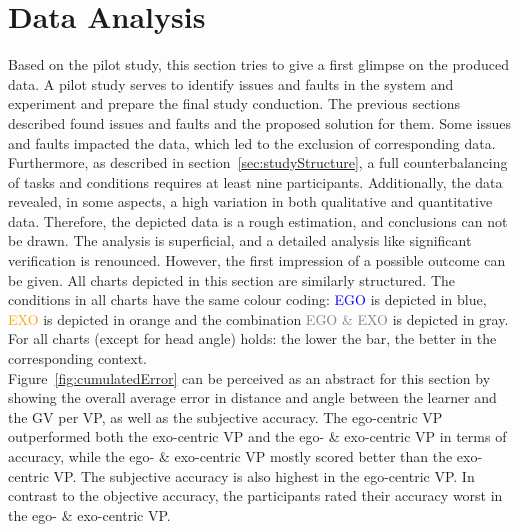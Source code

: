 \section{Data Analysis}
\label{sec:evalDataAna}
Based on the pilot study, this section tries to give a first glimpse on the produced data. A pilot study serves to identify issues and faults in the system and experiment and prepare the final study conduction. The previous sections described found issues and faults and the proposed solution for them. Some issues and faults impacted the data, which led to the exclusion of corresponding data. Furthermore, as described in section~\ref{sec:studyStructure}, a full counterbalancing of tasks and conditions requires at least nine participants. Additionally, the data revealed, in some aspects, a high variation in both qualitative and quantitative data. Therefore, the depicted data is a rough estimation, and conclusions can not be drawn. The analysis is superficial, and a detailed analysis like significant verification is renounced. However, the first impression of a possible outcome can be given. All charts depicted in this section are similarly structured. The conditions in all charts have the same colour coding: \textcolor{blue}{EGO} is depicted in blue, \textcolor{orange}{EXO} is depicted in orange and the combination \textcolor{gray}{EGO \& EXO} is depicted in gray. For all charts (except for head angle) holds: the lower the bar, the better in the corresponding context.\\
Figure~\ref{fig:cumulatedError} can be perceived as an abstract for this section by showing the overall average error in distance and angle between the learner and the GV per VP, as well as the subjective accuracy. The ego-centric VP outperformed both the exo-centric VP and the ego- \& exo-centric VP in terms of accuracy, while the ego- \& exo-centric VP mostly scored better than the exo-centric VP. The subjective accuracy is also highest in the ego-centric VP. In contrast to the objective accuracy, the participants rated their accuracy worst in the ego- \& exo-centric VP.
